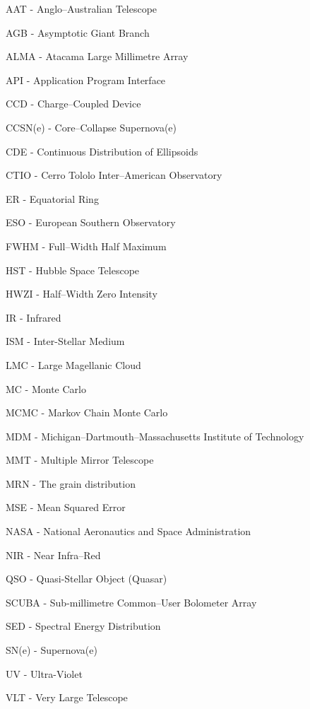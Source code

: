 



%
%

AAT - Anglo--Australian Telescope

AGB - Asymptotic Giant Branch

ALMA - Atacama Large Millimetre Array

API - Application Program Interface

CCD - Charge--Coupled Device

CCSN(e) - Core--Collapse Supernova(e)

CDE - Continuous Distribution of Ellipsoids

CTIO - Cerro Tololo Inter--American Observatory

ER - Equatorial Ring

ESO - European Southern Observatory

FWHM - Full--Width Half Maximum

HST - Hubble Space Telescope

HWZI - Half--Width Zero Intensity

IR - Infrared

ISM - Inter-Stellar Medium

LMC - Large Magellanic Cloud

MC - Monte Carlo

MCMC - Markov Chain Monte Carlo 

MDM - Michigan--Dartmouth--Massachusetts Institute of Technology

MMT - Multiple Mirror Telescope

MRN - The \citet*{Mathis1977} grain distribution

MSE - Mean Squared Error

NASA - National Aeronautics and Space Administration

NIR - Near Infra--Red

QSO - Quasi-Stellar Object (Quasar)

SCUBA - Sub-millimetre Common--User Bolometer Array

SED - Spectral Energy Distribution

SN(e) - Supernova(e)

UV - Ultra-Violet

VLT - Very Large Telescope

